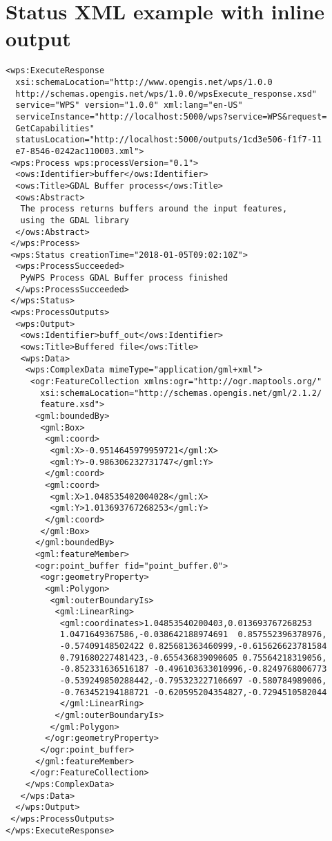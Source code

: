 \section{Status XML example with inline output}
\label{app:status_inline}
\begin{lstlisting}[basicstyle=\small,caption={Status XML example}]
<wps:ExecuteResponse
  xsi:schemaLocation="http://www.opengis.net/wps/1.0.0 
  http://schemas.opengis.net/wps/1.0.0/wpsExecute_response.xsd" 
  service="WPS" version="1.0.0" xml:lang="en-US" 
  serviceInstance="http://localhost:5000/wps?service=WPS&request=
  GetCapabilities" 
  statusLocation="http://localhost:5000/outputs/1cd3e506-f1f7-11
  e7-8546-0242ac110003.xml">
 <wps:Process wps:processVersion="0.1">
  <ows:Identifier>buffer</ows:Identifier>
  <ows:Title>GDAL Buffer process</ows:Title>
  <ows:Abstract>
   The process returns buffers around the input features,
   using the GDAL library
  </ows:Abstract>
 </wps:Process>
 <wps:Status creationTime="2018-01-05T09:02:10Z">
  <wps:ProcessSucceeded>
   PyWPS Process GDAL Buffer process finished
  </wps:ProcessSucceeded>
 </wps:Status>
 <wps:ProcessOutputs>
  <wps:Output>
   <ows:Identifier>buff_out</ows:Identifier>
   <ows:Title>Buffered file</ows:Title>
   <wps:Data>
    <wps:ComplexData mimeType="application/gml+xml">
     <ogr:FeatureCollection xmlns:ogr="http://ogr.maptools.org/" 
       xsi:schemaLocation="http://schemas.opengis.net/gml/2.1.2/
       feature.xsd">
      <gml:boundedBy>
       <gml:Box>
        <gml:coord>
         <gml:X>-0.9514645979959721</gml:X>
         <gml:Y>-0.986306232731747</gml:Y>
        </gml:coord>
        <gml:coord>
         <gml:X>1.048535402004028</gml:X>
         <gml:Y>1.013693767268253</gml:Y>
        </gml:coord>
       </gml:Box>
      </gml:boundedBy>
      <gml:featureMember>
      <ogr:point_buffer fid="point_buffer.0">
       <ogr:geometryProperty>
        <gml:Polygon>
         <gml:outerBoundaryIs>
          <gml:LinearRing>
           <gml:coordinates>1.04853540200403,0.013693767268253 
           1.0471649367586,-0.038642188974691  0.857552396378976,
           -0.57409148502422 0.825681363460999,-0.615626623781584 
           0.791680227481423,-0.655436839090605 0.75564218319056,
           -0.852331636516187 -0.496103633010996,-0.8249768006773
           -0.539249850288442,-0.795323227106697 -0.580784989006,
           -0.763452194188721 -0.620595204354827,-0.7294510582044
           </gml:LinearRing>
          </gml:outerBoundaryIs>
         </gml:Polygon>
        </ogr:geometryProperty>
       </ogr:point_buffer>
      </gml:featureMember>
     </ogr:FeatureCollection>
    </wps:ComplexData>
   </wps:Data>
  </wps:Output>
 </wps:ProcessOutputs>
</wps:ExecuteResponse>
\end{lstlisting}

